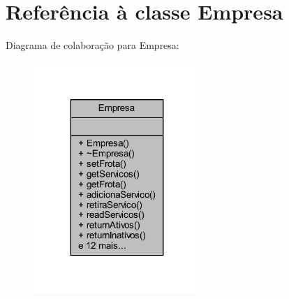 \hypertarget{class_empresa}{}\section{Referência à classe Empresa}
\label{class_empresa}


Diagrama de colaboração para Empresa\+:
\nopagebreak
\begin{figure}[H]
\begin{center}
\leavevmode
\includegraphics[width=179pt]{class_empresa__coll__graph}
\end{center}
\end{figure}
